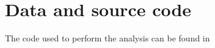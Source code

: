 \chapter{Data and source code}\label{data_and_source_code}
The code used to perform the analysis can be found in \href{this repository}{}
